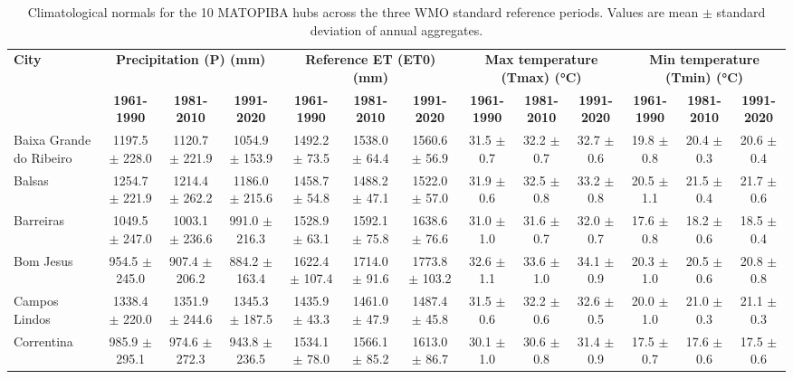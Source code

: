 \begin{table}[H]
\centering
\caption{Climatological normals for the 10 MATOPIBA hubs across the three WMO standard reference periods. Values are mean $\pm$ standard deviation of annual aggregates.}
\label{tab:climatological_normals}
\footnotesize
\renewcommand{\arraystretch}{1.2}
\begin{tabular}{lcccccccccccc}
\toprule
\textbf{City} & \multicolumn{3}{c}{\textbf{Precipitation (P) (mm)}} & \multicolumn{3}{c}{\textbf{Reference ET (ET0) (mm)}} & \multicolumn{3}{c}{\textbf{Max temperature (Tmax) (°C)}} & \multicolumn{3}{c}{\textbf{Min temperature (Tmin) (°C)}} \\
 & \textbf{1961-1990} & \textbf{1981-2010} & \textbf{1991-2020} & \textbf{1961-1990} & \textbf{1981-2010} & \textbf{1991-2020} & \textbf{1961-1990} & \textbf{1981-2010} & \textbf{1991-2020} & \textbf{1961-1990} & \textbf{1981-2010} & \textbf{1991-2020} \\
\midrule
Baixa Grande do Ribeiro & 1197.5 $\pm$ 228.0 & 1120.7 $\pm$ 221.9 & 1054.9 $\pm$ 153.9 & 1492.2 $\pm$ 73.5 & 1538.0 $\pm$ 64.4 & 1560.6 $\pm$ 56.9 & 31.5 $\pm$ 0.7 & 32.2 $\pm$ 0.7 & 32.7 $\pm$ 0.6 & 19.8 $\pm$ 0.8 & 20.4 $\pm$ 0.3 & 20.6 $\pm$ 0.4 \\
Balsas & 1254.7 $\pm$ 221.9 & 1214.4 $\pm$ 262.2 & 1186.0 $\pm$ 215.6 & 1458.7 $\pm$ 54.8 & 1488.2 $\pm$ 47.1 & 1522.0 $\pm$ 57.0 & 31.9 $\pm$ 0.6 & 32.5 $\pm$ 0.8 & 33.2 $\pm$ 0.8 & 20.5 $\pm$ 1.1 & 21.5 $\pm$ 0.4 & 21.7 $\pm$ 0.6 \\
Barreiras & 1049.5 $\pm$ 247.0 & 1003.1 $\pm$ 236.6 & 991.0 $\pm$ 216.3 & 1528.9 $\pm$ 63.1 & 1592.1 $\pm$ 75.8 & 1638.6 $\pm$ 76.6 & 31.0 $\pm$ 1.0 & 31.6 $\pm$ 0.7 & 32.0 $\pm$ 0.7 & 17.6 $\pm$ 0.8 & 18.2 $\pm$ 0.6 & 18.5 $\pm$ 0.4 \\
Bom Jesus & 954.5 $\pm$ 245.0 & 907.4 $\pm$ 206.2 & 884.2 $\pm$ 163.4 & 1622.4 $\pm$ 107.4 & 1714.0 $\pm$ 91.6 & 1773.8 $\pm$ 103.2 & 32.6 $\pm$ 1.1 & 33.6 $\pm$ 1.0 & 34.1 $\pm$ 0.9 & 20.3 $\pm$ 1.0 & 20.5 $\pm$ 0.6 & 20.8 $\pm$ 0.8 \\
Campos Lindos & 1338.4 $\pm$ 220.0 & 1351.9 $\pm$ 244.6 & 1345.3 $\pm$ 187.5 & 1435.9 $\pm$ 43.3 & 1461.0 $\pm$ 47.9 & 1487.4 $\pm$ 45.8 & 31.5 $\pm$ 0.6 & 32.2 $\pm$ 0.6 & 32.6 $\pm$ 0.5 & 20.0 $\pm$ 1.0 & 21.0 $\pm$ 0.3 & 21.1 $\pm$ 0.3 \\
Correntina & 985.9 $\pm$ 295.1 & 974.6 $\pm$ 272.3 & 943.8 $\pm$ 236.5 & 1534.1 $\pm$ 78.0 & 1566.1 $\pm$ 85.2 & 1613.0 $\pm$ 86.7 & 30.1 $\pm$ 1.0 & 30.6 $\pm$ 0.8 & 31.4 $\pm$ 0.9 & 17.5 $\pm$ 0.7 & 17.6 $\pm$ 0.6 & 17.5 $\pm$ 0.6 \\

\end{tabular}
\end{table}
